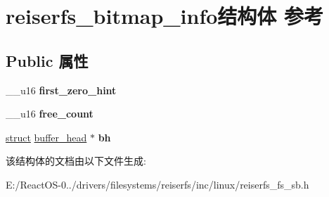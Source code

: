 \hypertarget{structreiserfs__bitmap__info}{}\section{reiserfs\+\_\+bitmap\+\_\+info结构体 参考}
\label{structreiserfs__bitmap__info}
\subsection*{Public 属性}
\begin{DoxyCompactItemize}
\item 
\mbox{\label{structreiserfs__bitmap__info_aed32ad94fc5f2af2f32eefc5e5b4ce11}} 
\+\_\+\+\_\+u16 {\bfseries first\+\_\+zero\+\_\+hint}
\item 
\mbox{\label{structreiserfs__bitmap__info_a3975ba6acb092a8553858725f7d42f0b}} 
\+\_\+\+\_\+u16 {\bfseries free\+\_\+count}
\item 
\mbox{\label{structreiserfs__bitmap__info_a6945f128c9f6b7337698f60cdba0ac62}} 
\hyperlink{interfacestruct}{struct} \hyperlink{structbuffer__head}{buffer\+\_\+head} $\ast$ {\bfseries bh}
\end{DoxyCompactItemize}


该结构体的文档由以下文件生成\+:\begin{DoxyCompactItemize}
\item 
E\+:/\+React\+O\+S-\/0../drivers/filesystems/reiserfs/inc/linux/reiserfs\+\_\+fs\+\_\+sb.\+h\end{DoxyCompactItemize}

